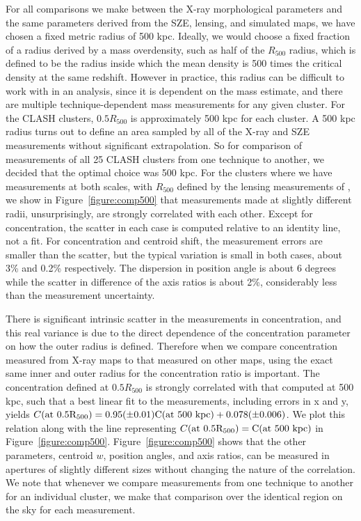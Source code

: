 \documentclass[iop,twocolumn]{emulateapj}
\begin{document}
{For all comparisons we make between the X-ray morphological parameters and the same parameters derived from the SZE, lensing,
and simulated maps,
we have chosen a fixed metric radius of 500 kpc. Ideally, we would choose a fixed fraction of a radius derived by
a mass overdensity, such as half of the $R_{500}$ radius, which is defined to be the radius inside which the mean
density is 500 times the critical density at the same redshift. However in practice, this radius can be difficult to 
work with in an analysis, since it is dependent on the mass estimate, and there are multiple technique-dependent mass measurements for any given cluster.
For the CLASH clusters, $0.5 R_{500} $ is approximately 500 kpc for each cluster. A 500 kpc radius turns out to define an area sampled
by all of the X-ray and SZE measurements without significant extrapolation. So for comparison of measurements of all 25 
CLASH clusters from one technique to another, we decided that the optimal choice was 500 kpc. For the clusters where
we have measurements at both scales, with $R_{500}$ defined by the lensing measurements of \citet{2015ApJ...806....4M},
we show in Figure~\ref{figure:comp500} that measurements made at slightly different radii, unsurprisingly, are
strongly correlated with each other. Except for concentration, 
the scatter in each case is computed relative to an identity line, not a fit. 
For concentration and centroid shift, the measurement errors are smaller than the scatter, but the typical variation is small in
both cases, about 3\% and 0.2\% respectively. The dispersion in position angle is about 6 degrees while the 
scatter in difference of the axis ratios is about 2\%, considerably less than the measurement uncertainty.

There is significant intrinsic scatter in the measurements in concentration, and  this real variance is due to the 
direct dependence of the concentration parameter on how the outer radius is defined. Therefore when we compare concentration
measured from X-ray maps to that measured on other maps, using the exact same inner and outer radius for the concentration ratio 
is important. The concentration defined at $0.5 R_{500}$ is strongly correlated with that computed at 500 kpc,
such that a best linear fit to the measurements, including errors in x and y, 
yields $C( \rm{at~0.5R_{500}}) = 0.95 (\pm 0.01) C( \rm{at~500~kpc}) +0.078 (\pm0.006)$. We plot this relation along with the line representing $C( \rm{at~0.5R_{500}}) = C( \rm{at~500~kpc})$ in Figure~\ref{figure:comp500}. 
Figure~\ref{figure:comp500} shows that the other parameters, centroid $w$, position angles, and axis ratios, can be measured in apertures of slightly different sizes without changing the nature of the correlation.
We note that whenever we compare measurements from one technique to another for an individual cluster, we make that comparison over the identical region on the sky for each measurement.

}
\end{document}

